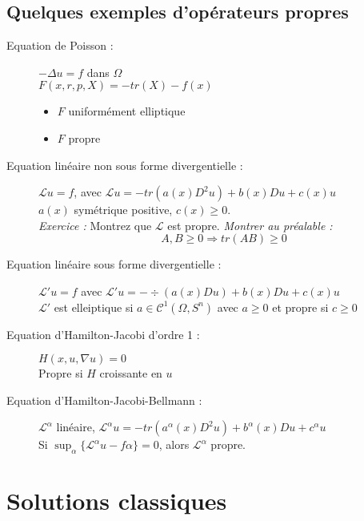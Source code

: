 \subsection{Quelques exemples d'opérateurs propres}
\begin{description}
\item[Equation de Poisson : ] $-\Delta u=f$ dans $\Omega$\\
$F(x,r,p,X)=-tr(X)-f(x)$
\begin{itemize}
	\item $F$ uniformément elliptique
	\item $F$ propre
\end{itemize}

\item[Equation linéaire non sous forme divergentielle :] $\mathscr{L}u=f$, avec $\mathscr{L}u=-tr(a(x)D^2u)+b(x)Du+c(x)u$\\
$a(x)$ symétrique positive, $c(x)\geq 0$. \\
\textit{Exercice :} Montrez que $\mathscr{L}$ est propre. \textit{Montrer au préalable :} \[A,B\geq 0 \Rightarrow tr(AB)\geq 0\]

\item[Equation linéaire sous forme divergentielle :] $\mathscr{L}'u=f$ avec $\mathscr{L}'u=-\div(a(x)Du)+b(x)Du+c(x)u$\\
$\mathscr{L}'$ est elleiptique si $a\in\mathscr{C}^1(\Omega,S^n)$ avec $a\geq 0$ et propre si $c\geq 0$

\item[Equation d'Hamilton-Jacobi d'ordre 1 : ] $H(x,u,\nabla u)=0$\\
Propre si $H$ croissante en $u$

\item[Equation d'Hamilton-Jacobi-Bellmann : ] $\mathscr{L}^\alpha$ linéaire, $\mathscr{L}^\alpha u=-tr(a^\alpha(x)D^2u)+b^\alpha(x)Du+c^\alpha u$\\
Si $\sup_\alpha \{\mathscr{L}^\alpha u-f\alpha\}=0$, alors $\mathscr{L}^\alpha$ propre.
\end{description}

\section{Solutions classiques}

